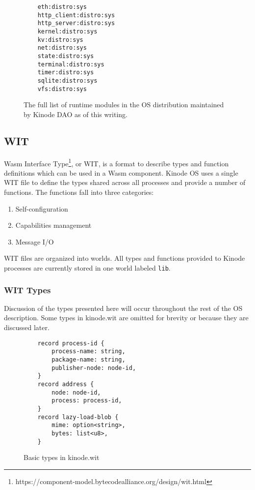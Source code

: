 \documentclass[runningheads]{llncs}
\begin{document}
\begin{figure}
    \centering
    \begin{lstlisting}
    eth:distro:sys
    http_client:distro:sys
    http_server:distro:sys
    kernel:distro:sys
    kv:distro:sys
    net:distro:sys
    state:distro:sys
    terminal:distro:sys
    timer:distro:sys
    sqlite:distro:sys
    vfs:distro:sys
    \end{lstlisting}
    \caption{The full list of runtime modules in the OS distribution maintained by Kinode DAO as of this writing.}
    \label{fig:runtime modules list}
\end{figure}

\subsection{WIT}
\label{sec:oswit}

Wasm Interface Type\footnote{https://component-model.bytecodealliance.org/design/wit.html}, or WIT, is a format to describe types and function definitions which can be used in a Wasm component.
Kinode OS uses a single WIT file to define the types shared across all processes and provide a number of functions.
The functions fall into three categories:
\begin{enumerate}
    \item Self-configuration
    \item Capabilities management
    \item Message I/O
\end{enumerate}

WIT files are organized into worlds. All types and functions provided to Kinode processes are currently stored in one world labeled \verb|lib|.

\subsubsection{WIT Types}
\label{sec:oswittypes}

Discussion of the types presented here will occur throughout the rest of the OS description.
Some types in kinode.wit are omitted for brevity or because they are discussed later.

\begin{figure}[H]
    \centering
    \begin{lstlisting}
    record process-id {
        process-name: string,
        package-name: string,
        publisher-node: node-id,
    }
    record address {
        node: node-id,
        process: process-id,
    }
    record lazy-load-blob {
        mime: option<string>,
        bytes: list<u8>,
    }
    \end{lstlisting}
    \caption{Basic types in kinode.wit}
    \label{fig:WIT Types 1}
\end{figure}
\end{document}
